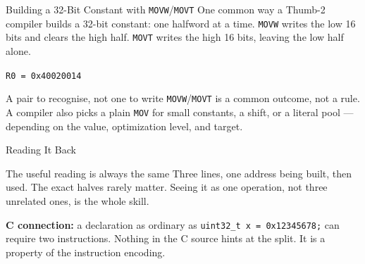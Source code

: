 \documentclass[9pt,aspectratio=169,xcolor=table]{beamer}
\begin{document}
\begin{frame}[fragile]{Building a 32-Bit Constant with \texttt{MOVW}/\texttt{MOVT}}
    \leavevmode
    {\small One common way a Thumb-2 compiler builds a 32-bit constant:
    one halfword at a time. \texttt{MOVW} writes the low 16 bits and
    clears the high half. \texttt{MOVT} writes the high 16 bits, leaving
    the low half alone.}

    \vspace{2mm}
    \begin{center}
    \end{center}

    \vspace{2mm}
    \begin{center}
        \large\texttt{R0 = 0x40020014}
    \end{center}

    \vspace{2mm}
    \begin{block}{A pair to recognise, not one to write}
        {\small \texttt{MOVW}/\texttt{MOVT} is a \alert{common outcome},
        not a rule. A compiler also picks a plain \texttt{MOV} for small
        constants, a shift, or a literal pool --- depending on the
        value, optimization level, and target.}
    \end{block}
\end{frame}

\begin{frame}[fragile]{Reading It Back}
    \leavevmode
    \begin{center}
    \end{center}

    \vspace{3mm}
    \begin{block}{The useful reading is always the same}
        Three lines, \alert{one address being built, then used}. The exact
        halves rarely matter. Seeing it as one operation, not three
        unrelated ones, is the whole skill.
    \end{block}

    \vspace{3mm}
    {\small \textbf{C connection:} a declaration as ordinary as
    \texttt{uint32\_t x = 0x12345678;} can require two instructions.
    Nothing in the C source hints at the split. It is a property of the
    \alert{instruction encoding}.}
\end{frame}
\end{document}
